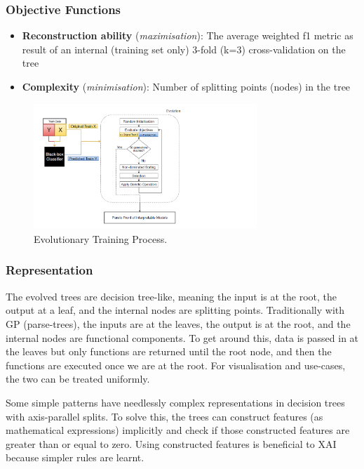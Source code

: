 \subsubsection{Objective Functions}
\begin{itemize}
\item \textbf{Reconstruction ability} (\textit{maximisation}): The average weighted f1 metric as result of an internal (training set only) 3-fold (k=3) cross-validation on the tree
\end{itemize}
\begin{itemize}
\item \textbf{Complexity} (\textit{minimisation}): Number of splitting points (nodes) in the tree
\end{itemize}

\begin{figure}
\includegraphics[width=0.75\textwidth]{evolution_process}
\caption{Evolutionary Training Process.}
\label{fig:evolution}
\end{figure}

\subsubsection{Representation}
The evolved trees are decision tree-like, meaning the input is at the root, the output at a leaf, and the internal nodes are splitting points. Traditionally with GP (parse-trees), the inputs are at the leaves, the output is at the root, and the internal nodes are functional components. To get around this, data is passed in at the leaves but only functions are returned until the root node, and then the functions are executed once we are at the root. For visualisation and use-cases, the two can be treated uniformly. 

Some simple patterns have needlessly complex representations in decision trees with axis-parallel splits. To solve this, the trees can construct features (as mathematical expressions) implicitly and check if those constructed features are greater than or equal to zero. Using constructed features is beneficial to XAI because simpler rules are learnt.

